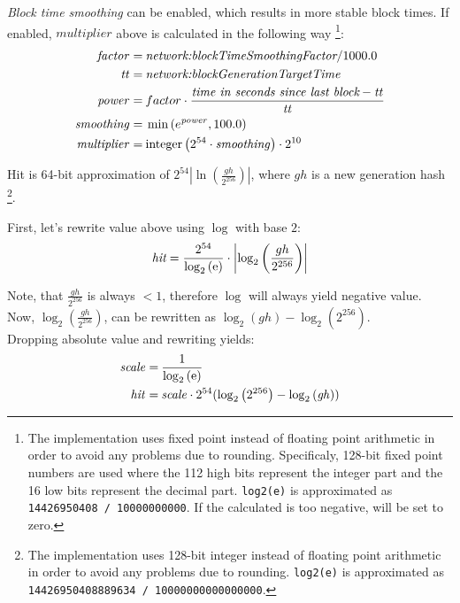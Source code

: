 \emph{Block time smoothing} can be enabled, which results in more stable block times.
If enabled, $multiplier$ above is calculated in the following way
\footnote{
	The implementation uses fixed point instead of floating point arithmetic in order to avoid any problems due to rounding.
	Specificaly, 128-bit fixed point numbers are used where the 112 high bits represent the integer part and the 16 low bits represent the decimal part.
	\texttt{log2(e)} is approximated as \texttt{14426950408 / 10000000000}.
	If the calculated  is too negative,  will be set to zero.
}:
\begin{align*}
\mathit{factor} = \: & \nemsetting{network}{blockTimeSmoothingFactor} / 1000.0 \\
\mathit{tt} = \: & \nemsetting{network}{blockGenerationTargetTime} \\
\mathit{power} = \: & factor \cdot \frac{\textit{time in seconds since last block} - \mathit{tt}}{\mathit{tt}} \\
\mathit{smoothing} = \: & \min\left(e^{\mathit{power}}, 100.0\right) \\
\mathit{multiplier} = \: & \mathfunc{integer}\left(2^{54} \cdot \mathit{smoothing}\right) \cdot 2^{10}
\end{align*}

Hit is 64-bit approximation of $2^{54} \left|\ln\left(\frac{\mathit{gh}}{2^{256}}\right)\right|$, where $\mathit{gh}$ is a new generation hash
\footnote{
	The implementation uses 128-bit integer instead of floating point arithmetic in order to avoid any problems due to rounding.
	\texttt{log2(e)} is approximated as \texttt{14426950408889634 / 10000000000000000}.
}.

First, let's rewrite value above using $\log$ with base $2$:
$$
\textit{hit} = \frac{2^{54}}{\log_2\left(\mathrm{e}\right)} \cdot \left|\log_2\left(\frac{gh}{2^{256}}\right)\right|
$$

Note, that $\frac{gh}{2^{256}}$ is always $< 1$, therefore $\log$ will always yield negative value. \\
Now, $\log_2\left(\frac{gh}{2^{256}}\right)$, can be rewritten as $\log_2\left(gh\right) - \log_2\left(2^{256}\right)$. \\

Dropping absolute value and rewriting yields:
\begin{align*}
	\mathit{scale} = \: & \frac{1}{\log_2\left(\mathrm{e}\right)} \\
	\mathit{hit} = \: & \mathit{scale} \cdot 2^{54} (\log_2\left(2^{256}\right) - \log_2\left(\mathit{gh}\right))
\end{align*}

